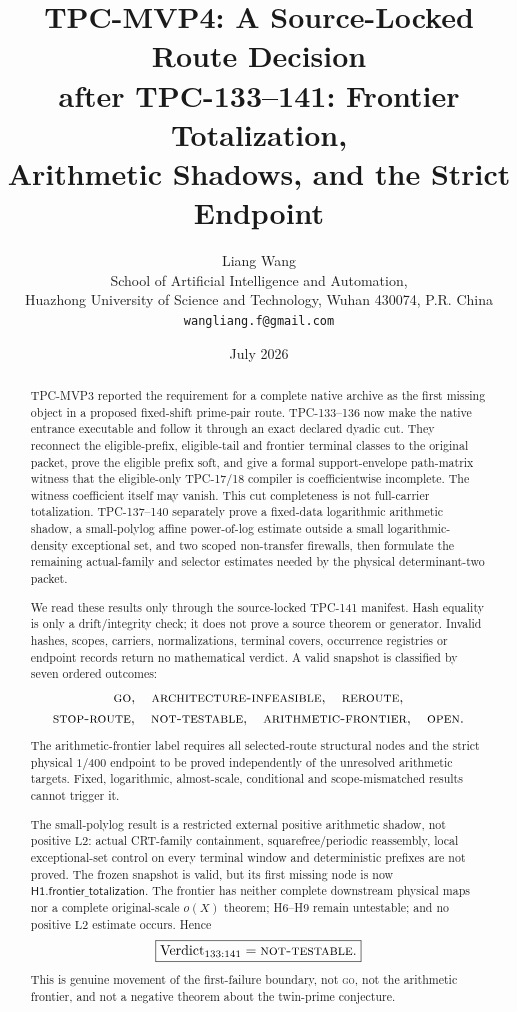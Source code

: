 \documentclass[11pt]{article}
\title{\textbf{TPC-MVP4: A Source-Locked Route Decision}\\
\textbf{after TPC-133--141: Frontier Totalization,}\\
\textbf{Arithmetic Shadows, and the Strict Endpoint}}
\author{Liang Wang\\
School of Artificial Intelligence and Automation,\\
Huazhong University of Science and Technology, Wuhan 430074, P.R. China\\
\texttt{wangliang.f@gmail.com}}
\date{July 2026}
\theoremstyle{definition}
\theoremstyle{remark}
\begin{document}
\maketitle

\begin{abstract}
TPC-MVP3 reported the requirement for a complete native archive as
the first missing object in a proposed fixed-shift prime-pair route.
TPC-133--136 now make the native entrance executable and follow it
through an exact declared dyadic cut.  They reconnect the
eligible-prefix, eligible-tail and frontier terminal classes to the
original packet, prove the eligible prefix soft, and give a formal
support-envelope path-matrix witness that the eligible-only TPC-17/18
compiler is coefficientwise incomplete.  The witness coefficient
itself may vanish.
This cut completeness is not full-carrier totalization.
TPC-137--140 separately prove a fixed-data logarithmic arithmetic
shadow, a small-polylog affine power-of-log estimate outside a small
logarithmic-density exceptional set, and two scoped non-transfer
firewalls, then formulate the remaining actual-family and selector
estimates needed by the physical determinant-two packet.

We read these results only through the source-locked TPC-141
manifest.  Hash equality is only a drift/integrity check; it does not
prove a source theorem or generator.  Invalid hashes, scopes,
carriers, normalizations, terminal covers, occurrence registries or
endpoint records return no mathematical verdict.  A valid snapshot is
classified by seven
ordered outcomes:
\[
\begin{gathered}
\textsc{go},\quad \textsc{architecture-infeasible},\quad
\textsc{reroute},\\
\textsc{stop-route},\quad \textsc{not-testable},\quad
\textsc{arithmetic-frontier},\quad \textsc{open}.
\end{gathered}
\]
The arithmetic-frontier label requires all selected-route structural
nodes and the strict physical \(1/400\) endpoint to be proved
independently of the unresolved arithmetic targets.  Fixed,
logarithmic, almost-scale, conditional and scope-mismatched results
cannot trigger it.

The small-polylog result is a restricted external positive arithmetic
shadow, not positive \(\mathrm{L2}\): actual CRT-family containment,
squarefree/periodic reassembly, local exceptional-set control on every
terminal window and deterministic prefixes are not proved.  The
frozen snapshot is valid, but its first missing node is now
\(\mathsf{H1.frontier\_totalization}\).  The frontier has neither
complete downstream physical maps nor a complete original-scale
\(o(X)\) theorem; H6--H9 remain untestable; and no positive
\(\mathrm{L2}\) estimate occurs.  Hence
\[
 \boxed{\operatorname{Verdict}_{133:141}
 =\textsc{not-testable}.}
\]
This is genuine movement of the first-failure boundary, not
\textsc{go}, not the arithmetic frontier, and not a negative theorem
about the twin-prime conjecture.
\end{abstract}
\end{document}
